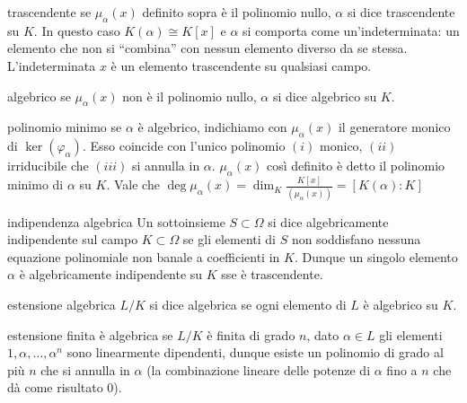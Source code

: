 \begin{definition}{trascendente}
    se $\mu_{\alpha}(x)$ definito sopra è il polinomio nullo, $\alpha$ si dice trascendente su $K$.
    In questo caso $K(\alpha) \cong K[x]$ e $\alpha$ si comporta come un'indeterminata: un elemento che non si ``combina'' con nessun elemento diverso da se stessa.
    L'indeterminata $x$ è un elemento trascendente su qualsiasi campo.
\end{definition}
\begin{definition}{algebrico}
    se $\mu_{\alpha}(x)$ non è il polinomio nullo, $\alpha$ si dice algebrico su $K$.
\end{definition}
\begin{definition}{polinomio minimo}
    se $\alpha$ è algebrico, indichiamo con $\mu_{\alpha}(x)$ il generatore monico di $\ker(\varphi_\alpha)$. Esso coincide con l'unico polinomio $(i)$ monico, $(ii)$ irriducibile che $(iii)$ si annulla in $\alpha$.
    $\mu_{\alpha}(x)$ così definito è detto il polinomio minimo di $\alpha$ su $K$. Vale che $\deg \mu_\alpha(x) = \dim_K \frac{K[x]}{(\mu_{\alpha}(x))} = [K(\alpha) : K]$
\end{definition}
\begin{definition}{indipendenza algebrica}
    Un sottoinsieme $S \subset \Omega$ si dice algebricamente indipendente sul campo $K \subset \Omega$ se gli elementi di $S$ non soddisfano nessuna equazione polinomiale non banale a coefficienti in $K$. Dunque un singolo elemento $\alpha$ è algebricamente indipendente su $K$ sse è trascendente.
\end{definition}
\begin{definition}{estensione algebrica}
    $L/K$ si dice algebrica se ogni elemento di $L$ è algebrico su $K$.
\end{definition}
\begin{proposition}{estensione finita è algebrica}
    se $L/K$ è finita di grado $n$, dato $\alpha \in L$ gli elementi $1,\alpha,\dots,\alpha^n$ sono linearmente dipendenti, dunque esiste un polinomio di grado al più $n$ che si annulla in $\alpha$ (la combinazione lineare delle potenze di $\alpha$ fino a $n$ che dà come risultato $0$).
\end{proposition}

